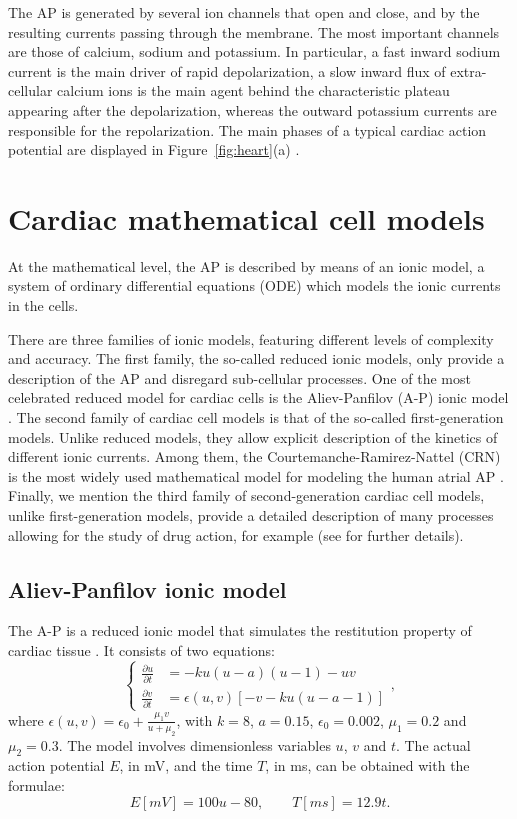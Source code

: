 \documentclass[11pt,a4paper]{article}
\begin{document}
The AP is generated by several ion channels that open and close, and by
the resulting currents passing through the membrane. The most important
channels are those of calcium, sodium and potassium. In particular, a fast
inward sodium current is the main driver of rapid depolarization, a slow
inward flux of extra-cellular calcium ions is the main agent behind the characteristic plateau appearing after the depolarization, whereas the outward
potassium currents are responsible for the repolarization. The main phases of a typical cardiac action potential are displayed in Figure~\ref{fig:heart}(a) \cite{quarteroni2019,franzone2014mathematical}.


\section{Cardiac mathematical cell models}\label{sec:math}
At the mathematical level, the AP is described by means of an ionic model, a system of ordinary differential equations (ODE) which models the ionic currents in the cells.

There are three families of ionic models, featuring different levels of complexity and accuracy. The first family, the so-called reduced ionic models, only provide a description of the AP and disregard sub-cellular processes. One of the most celebrated reduced model for cardiac cells is the Aliev-Panfilov (A-P) ionic model \cite{aliev1996simple}. The second family of cardiac cell models is that of the so-called first-generation models. Unlike reduced models, they allow explicit description of the kinetics of different ionic currents. Among them, the Courtemanche-Ramirez-Nattel (CRN) is the most widely used mathematical model for modeling the human atrial AP \cite{courtemanche1998ionic}. Finally, we mention the third family of second-generation cardiac cell models, unlike first-generation models, provide a detailed description of many processes allowing for the study of drug action, for example (see \cite{quarteroni2019,franzone2014mathematical} for further details). 
 
\subsection{Aliev-Panfilov ionic model}\label{subsec:aliev}
The A-P is a reduced ionic model that simulates the restitution property of cardiac tissue \cite{aliev1996simple}. It consists of two equations:
\begin{equation*}
\begin{cases}
\tfrac{\partial u}{\partial t} &= -ku(u-a)(u-1)-uv \\
\tfrac{\partial v}{\partial t} &= \epsilon(u,v)\left[ -v -ku(u-a-1)\right]
\end{cases},
\end{equation*}
where $\epsilon(u,v)=\epsilon_0+\tfrac{\mu_1 v}{u+\mu_2}$, with $k=8$, $a=0.15$, $\epsilon_0=0.002$, $\mu_1=0.2$ and $\mu_2=0.3$. The model involves dimensionless variables $u$, $v$ and $t$. The actual action potential $E$, in mV, and the time $T$, in ms, can be obtained with the formulae:
$$E[mV]=100u-80, \qquad T[ms]=12.9t .$$
\end{document}
